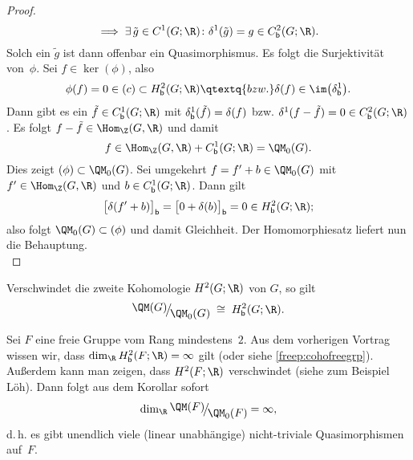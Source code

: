 \begin{proof}
\[        \implies \exists\,\tilde g\in C^1(G;\R)\colon
            \delta^1(\tilde g) = g \in \Cb^2(G;\R)
    . \]
    Solch ein $\tilde g$ ist dann offenbar ein Quasimorphismus. Es folgt die
    Surjektivität von~$\phi$. Sei $f\in\ker(\phi)$, also
    \[ \phi(f) = 0 \in\ker(c) \subset \Hb^2(G;\R)  \qtextq{bzw.}
        \delta(f) \in \im\bigl(\delta^1_\bd\bigr)
    . \]
    Dann gibt es ein $\tilde f\in\Cb^1(G;\R)$ mit $\delta^1_{\mathsf{b}}(\tilde f)
    = \delta(f)$ bzw. $\delta^1(f - \tilde f) = 0 \in\Cb^2(G;\R)$.
    Es folgt $f - \tilde f \in\Hom_\Z(G,\R)$ und damit
    \[ f \in \Hom_\Z(G,\R) + \Cb^1(G;\R) = \QM_0(G)  . \]
    Dies zeigt $\ker(\phi) \subset \QM_0(G)$. Sei umgekehrt
    $f = f'+b \in\QM_0(G)$ mit $f'\in\Hom_\Z(G,\R)$ und $b\in\Cb^1(G;\R)$.
    Dann gilt
    \[ \bigl[\delta(f'+b)\bigr]_\bd 
        = \bigl[0 + \delta(b)\bigr]_\bd = 0 \in \Hb^2(G;\R)
    ; \]
    also folgt $\QM_0(G) \subset \ker(\phi)$ und damit Gleichheit. Der
    Homomorphiesatz liefert nun die Behauptung.
    \\
\end{proof}

\begin{thKorollar}
    Verschwindet die zweite Kohomologie $H^2(G;\R)$ von $G$, so gilt
    \[ \Quot{\QM(G)}{\QM_0(G)} \;\cong\; \Hb^2(G;\R)  . \]
\end{thKorollar}

\begin{thBeispiel}
    Sei $F$ eine freie Gruppe vom Rang mindestens~$2$. Aus dem vorherigen
    Vortrag wissen wir, %
    dass $\dim_{\R} \Hb^2(F;\R) = \infty$ gilt (oder siehe
    \cref{freep:cohofreegrp}). Außerdem kann man zeigen, dass $H^2(F;\R)$
    verschwindet (siehe zum Beispiel
    Löh\cite[Ch.\,1,.4,\;Example~1.3.13]{lecnotes:loeh:bdcoho}).
    Dann folgt aus dem Korollar sofort
    \[ \dim_{\R} \Quot{\QM(F)}{\QM_0(F)} = \infty  , \]
    d.\,h. es gibt unendlich viele (linear unabhängige) nicht-triviale
    Quasimorphismen auf~$F$.
\end{thBeispiel}
